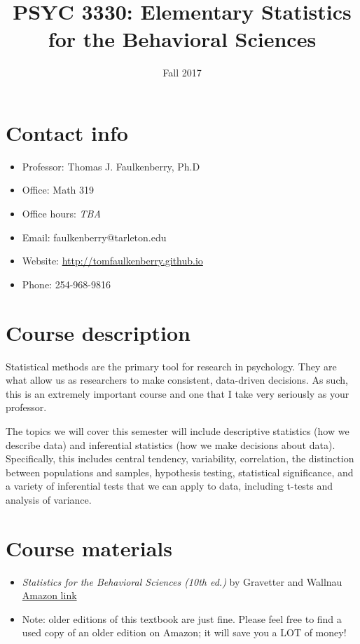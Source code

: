 \documentclass[10pt]{article}
\date{Fall 2017}
\title{PSYC 3330: Elementary Statistics for the Behavioral Sciences}
\begin{document}
\maketitle

\section*{Contact info}
\label{sec-1}
\begin{itemize}
\item Professor: Thomas J. Faulkenberry, Ph.D
\item Office: Math 319
\item Office hours: \emph{TBA}
\item Email: faulkenberry@tarleton.edu
\item Website: \url{http://tomfaulkenberry.github.io}
\item Phone: 254-968-9816
\end{itemize}

\section*{Course description}
\label{sec-2}

Statistical methods are the primary tool for research in psychology.  
They are what allow us as researchers to make consistent, data-driven 
decisions.  As such, this is an extremely important course and one that I 
take very seriously as your professor.

The topics we will cover this semester will include descriptive statistics 
(how we describe data) and inferential statistics (how we make decisions 
about data).  Specifically, this includes central tendency, variability, 
correlation, the distinction between populations and samples, hypothesis 
testing, statistical significance, and a variety of inferential tests 
that we can apply to data, including t-tests and analysis of variance.

\section*{Course materials}
\label{sec-3}
\begin{itemize}
\item \emph{Statistics for the Behavioral Sciences (10th ed.)} by Gravetter and Wallnau \href{http://www.amazon.com/Statistics-Behavioral-Sciences-MindTap-Psychology/dp/1305504917/}{Amazon link}
\item Note:  older editions of this textbook are just fine.  Please feel free to find a used copy of an older edition on Amazon; it will save you a LOT of money!
\end{itemize}
\end{document}
